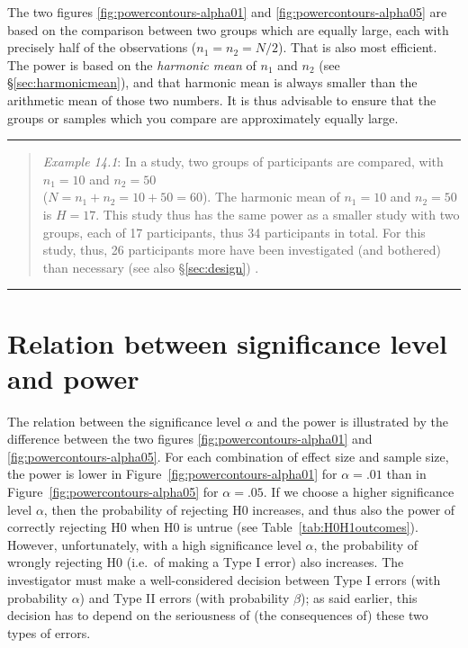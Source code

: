 \documentclass[
]{book}
\begin{document}
The two figures \ref{fig:powercontours-alpha01} and
\ref{fig:powercontours-alpha05} are based on the comparison between two groups which are equally large, each with
precisely half of the observations (\(n_1=n_2=N/2\)). That is also most efficient.
The power is based on the \emph{harmonic mean} of \(n_1\) and \(n_2\) (see §\ref{sec:harmonicmean}), and
that harmonic mean is always smaller than the arithmetic mean of those two numbers. It is thus
advisable to ensure that the groups or samples which you compare are approximately equally large.

\begin{center}\rule{0.5\linewidth}{0.5pt}\end{center}

\begin{quote}
\emph{Example 14.1}: In a study, two groups of participants are compared, with \(n_1=10\) and \(n_2=50\)\\
(\(N=n_1+n_2=10+50=60\)). The harmonic mean of \(n_1=10\) and \(n_2=50\) is \(H=17\). This study thus has the same
power as a smaller study with two groups, each of 17 participants, thus 34 participants in total. For this
study, thus, 26 participants more have been investigated (and bothered)
than necessary (see also §\ref{sec:design}) \citep[p.295]{ACA11}.
\end{quote}

\begin{center}\rule{0.5\linewidth}{0.5pt}\end{center}

\section{Relation between significance level and power}\label{sec:significancelevel-power}

The relation between the significance level \(\alpha\) and the power is
illustrated by the difference between the two figures
\ref{fig:powercontours-alpha01} and
\ref{fig:powercontours-alpha05}. For each combination of effect size
and sample size, the power is lower in
Figure~\ref{fig:powercontours-alpha01} for \(\alpha=.01\) than in
Figure~\ref{fig:powercontours-alpha05} for \(\alpha=.05\). If we choose a higher
significance level \(\alpha\), then the probability of rejecting H0
increases, and thus also the power of correctly rejecting H0 when H0
is untrue (see Table~\ref{tab:H0H1outcomes}).
However, unfortunately, with a high significance
level \(\alpha\), the probability of wrongly rejecting H0 (i.e.~of making a
Type I error) also increases. The investigator
must make a well-considered decision between Type I errors (with
probability \(\alpha\)) and Type II errors (with probability \(\beta\)); as said earlier,
this decision has to depend on the seriousness of (the consequences of) these
two types of errors.
\end{document}
